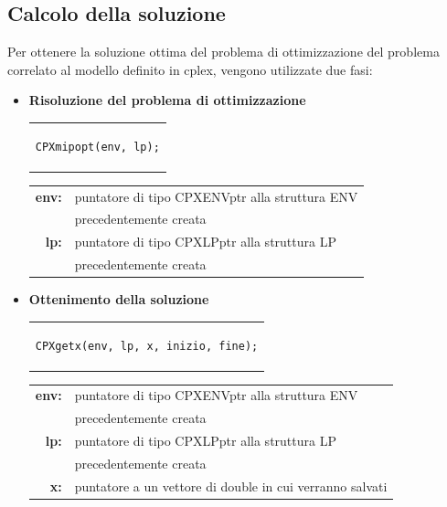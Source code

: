 \subsection{Calcolo della soluzione}
Per ottenere la soluzione ottima del problema di ottimizzazione del problema correlato al modello definito in cplex, vengono utilizzate due fasi:
\begin{itemize}
\item{\textbf{Risoluzione del problema di ottimizzazione}\\
\begin{center}
\begin{tabular}{c}
\begin{lstlisting}[linewidth=120pt, basicstyle=\footnotesize\sffamily,]
CPXmipopt(env, lp);
\end{lstlisting}
\end{tabular}
\end{center}
\begin{table}[h]
\centering
\begin{tabular}{rl}
\textbf{env:} & {puntatore di tipo CPXENVptr alla struttura ENV}\\
& {precedentemente creata}\\
\textbf{lp:} & {puntatore di tipo CPXLPptr alla struttura LP}\\
& {precedentemente creata}\\
\end{tabular}
\end{table}
}
\item{\textbf{Ottenimento della soluzione}\\
\begin{center}
\begin{tabular}{c}
\begin{lstlisting}[linewidth=230pt, basicstyle=\footnotesize\sffamily,]
CPXgetx(env, lp, x, inizio, fine);
\end{lstlisting}
\end{tabular}
\end{center}
\begin{table}[h]
\centering
\begin{tabular}{rl}
\textbf{env:} & {puntatore di tipo CPXENVptr alla struttura ENV}\\
& {precedentemente creata}\\
\textbf{lp:} & {puntatore di tipo CPXLPptr alla struttura LP}\\
& {precedentemente creata}\\
\textbf{x:} & {puntatore a un vettore di double in cui verranno salvati}\\

\end{tabular}
\end{table}}
\end{itemize}
